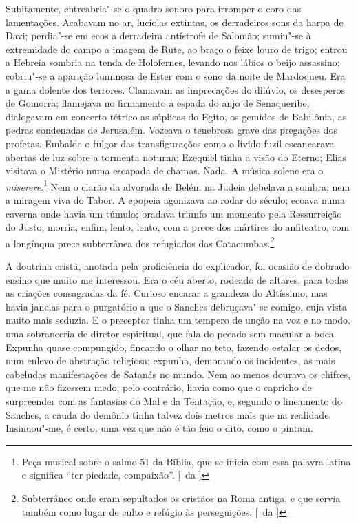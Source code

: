 Subitamente, entreabria"-se o quadro sonoro para
irromper o coro das lamentações. Acabavam no ar, lucíolas extintas, os
derradeiros sons da harpa de Davi; perdia"-se em ecos a derradeira
antístrofe de Salomão; sumiu"-se à extremidade do campo a imagem de
Rute, ao braço o feixe louro de trigo; entrou a Hebreia sombria na
tenda de Holofernes, levando nos lábios o beijo assassino; cobriu"-se
a aparição luminosa de Ester com o sono da noite de Mardoqueu. Era a
gama dolente dos terrores. Clamavam as imprecações do dilúvio, os
desesperos de Gomorra; flamejava no firmamento a espada do anjo de
Senaqueribe; dialogavam em concerto tétrico as súplicas do Egito, os
gemidos de Babilônia, as pedras condenadas de Jerusalém. Vozeava o
tenebroso grave das pregações dos profetas. Embalde o fulgor das
transfigurações como o lívido fuzil escancarava abertas de luz sobre a
tormenta noturna; Ezequiel tinha a visão do Eterno; Elias visitava o
Mistério numa escapada de chamas. Nada. A música solene era o 
\textit{miserere}.\footnote{ Peça musical sobre o salmo 51 da Bíblia, 
que se inicia com essa palavra latina e significa ``ter piedade, compaixão''. [~da ]}
Nem o clarão da alvorada de Belém na Judeia debelava a sombra; nem a
miragem viva do Tabor. A epopeia agonizava ao rodar do século; ecoava
numa caverna onde havia um túmulo; bradava triunfo um momento pela
Ressurreição do Justo; morria, enfim, lento, lento, com a prece dos
mártires do anfiteatro, com a longínqua prece subterrânea dos
refugiados das Catacumbas.\footnote{ Subterrâneo onde eram sepultados os cristãos na Roma antiga, 
e que servia também como lugar de culto e refúgio às perseguições. [~da ]} 

A doutrina cristã, anotada pela proficiência
do explicador, foi ocasião de dobrado ensino que muito me interessou.
Era o céu aberto, rodeado de altares, para todas as criações
consagradas da fé. Curioso encarar a grandeza do Altíssimo; mas havia
janelas para o purgatório a que o Sanches debruçava"-se comigo, cuja
vista muito mais seduzia. E o preceptor tinha um tempero de unção na
voz e no modo, uma sobranceria de diretor espiritual, que fala do
pecado sem macular a boca. Expunha quase compungido, fincando o olhar
no teto, fazendo estalar os dedos, num enlevo de abstração religiosa;
expunha, demorando os incidentes, as mais cabeludas manifestações de
Satanás no mundo. Nem ao menos dourava os chifres, que me não fizessem
medo; pelo contrário, havia como que o capricho de surpreender com as
fantasias do Mal e da Tentação, e, segundo o lineamento do Sanches, a
cauda do demônio tinha talvez dois metros mais que na realidade.
Insinuou"-me, é certo, uma vez que não é tão feio o dito, como o
pintam. 

